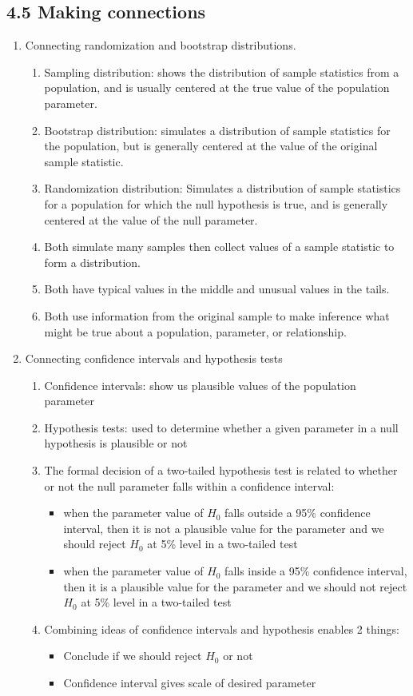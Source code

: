 \documentclass{article}
\begin{document}
\subsection{4.5 Making connections}
\begin{enumerate}

\item Connecting randomization and bootstrap distributions.
\begin{enumerate}
\item Sampling distribution: shows the distribution of sample statistics from a population, and is usually centered at the true value of the population parameter.
\item Bootstrap distribution: simulates a distribution of sample statistics for the population, but is generally centered at the value of the original sample statistic.
\item Randomization distribution: Simulates a distribution of sample statistics for a population for which the null hypothesis is true, and is generally centered at the value of the null parameter.
\item Both simulate many samples then collect values of a sample statistic to form a distribution.
\item Both have typical values in the middle and unusual values in the tails.
\item Both use information from the original sample to make inference what might be true about a population, parameter, or relationship.
\end{enumerate}

\item Connecting confidence intervals and hypothesis tests
\begin{enumerate}
\item Confidence intervals: show us plausible values of the population parameter
\item Hypothesis tests: used to determine whether a given parameter in a null hypothesis is plausible or not
\item The formal decision of a two-tailed hypothesis test is related to whether or not the null parameter falls within a confidence interval:
\begin{itemize}
\item when the parameter value of $H_0$ falls outside a 95\% confidence interval, then it is not a plausible value for the parameter and we should reject $H_0$ at 5\% level in a two-tailed test
\item when the parameter value of $H_0$ falls inside a 95\% confidence interval, then it is a plausible value for the parameter and we should not reject $H_0$ at 5\% level in a two-tailed test
\end{itemize}
\item Combining ideas of confidence intervals and hypothesis enables 2 things:
\begin{itemize}
\item Conclude if we should reject $H_0$ or not
\item Confidence interval gives scale of desired parameter
\end{itemize}
\end{enumerate}


\end{enumerate}
\end{document}
